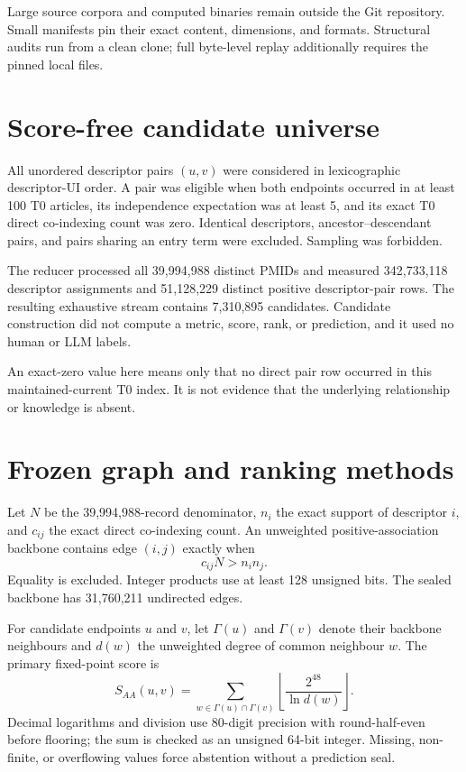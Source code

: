 \documentclass[11pt]{article}
\begin{document}
Large source corpora and computed binaries remain outside the Git repository. Small manifests pin
their exact content, dimensions, and formats. Structural audits run from a clean clone; full
byte-level replay additionally requires the pinned local files.

\section{Score-free candidate universe}

All unordered descriptor pairs $(u,v)$ were considered in lexicographic descriptor-UI order. A pair
was eligible when both endpoints occurred in at least 100 T0 articles, its independence expectation
was at least 5, and its exact T0 direct co-indexing count was zero. Identical descriptors,
ancestor--descendant pairs, and pairs sharing an entry term were excluded. Sampling was forbidden.

The reducer processed all 39,994,988 distinct PMIDs and measured 342,733,118 descriptor
assignments and 51,128,229 distinct positive descriptor-pair rows. The resulting exhaustive stream
contains 7,310,895 candidates. Candidate construction did not compute a metric, score, rank, or
prediction, and it used no human or LLM labels.

An exact-zero value here means only that no direct pair row occurred in this maintained-current T0
index. It is not evidence that the underlying relationship or knowledge is absent.

\section{Frozen graph and ranking methods}

Let $N$ be the 39,994,988-record denominator, $n_i$ the exact support of descriptor $i$, and
$c_{ij}$ the exact direct co-indexing count. An unweighted positive-association backbone contains
edge $(i,j)$ exactly when
\begin{equation}
  c_{ij}N > n_i n_j.
\end{equation}
Equality is excluded. Integer products use at least 128 unsigned bits. The sealed backbone has
31,760,211 undirected edges.

For candidate endpoints $u$ and $v$, let $\Gamma(u)$ and $\Gamma(v)$ denote their backbone
neighbours and $d(w)$ the unweighted degree of common neighbour $w$. The primary fixed-point score
is
\begin{equation}
 S_{AA}(u,v) = \sum_{w \in \Gamma(u)\cap\Gamma(v)}
 \left\lfloor\frac{2^{48}}{\ln d(w)}\right\rfloor.
\end{equation}
Decimal logarithms and division use 80-digit precision with round-half-even before flooring; the
sum is checked as an unsigned 64-bit integer. Missing, non-finite, or overflowing values force
abstention without a prediction seal.
\end{document}

